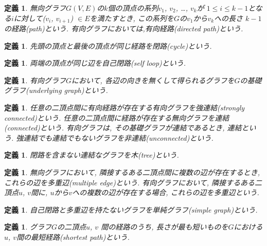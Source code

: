 \documentclass[11pt,a4j]{jsarticle}
\theoremstyle{plain}
\newtheorem{defi}[theo]{定義}
\def\vu{\mbox{\boldmath $u$}}
\def\vv{\mbox{\boldmath $v$}}
\def\node#1#2{\mbox{\boldmath $#1_{#2}$}}
\begin{document}
\begin{defi}
無向グラフ$G(V,E)$の$k$個の頂点の系列{\node v1}, {\node v2}, {\dots}, {\node vk}が $1\leq i \leq k - 1$となる$i$に対して({\node vi}, {\node v{i+1}}) $\in E$を満たすとき, この系列を$G$の{\node v1}から{\node vk}への長さ $k - 1$の経路(path)という. 有向グラフにおいては,有向経路(directed path)という. 
\end{defi}

\begin{defi}
先頭の頂点と最後の頂点が同じ経路を閉路(cycle)という.
\end{defi}

\begin{defi}
両端の頂点が同じ辺を自己閉路(self loop)という.
\end{defi}

\begin{defi}
有向グラフ$G$において, 各辺の向きを無くして得られるグラフを$G$の基礎グラフ(underlying graph)という.
\end{defi}

\begin{defi}
任意の二頂点間に有向経路が存在する有向グラフを強連結(strongly connected)という. 任意の二頂点間に経路が存在する無向グラフを連結(connected)という. 
有向グラフは, その基礎グラフが連結であるとき, 連結という. 強連結でも連結でもないグラフを非連結(unconnected)という.
\end{defi}

\begin{defi}
閉路を含まない連結なグラフを木(tree)という.
\end{defi}

\begin{defi}
無向グラフにおいて, 隣接するある二頂点間に複数の辺が存在するとき, これらの辺を多重辺(multiple edge)という. 有向グラフにおいて, 隣接するある二頂点{\vu , \vv}間に, 
{\vu}から{\vv}への複数の辺が存在する場合, これらの辺を多重辺という.
\end{defi}

\begin{defi}
自己閉路と多重辺を持たないグラフを単純グラフ(simple graph)という.
\end{defi}

\begin{defi}
グラフ$G$の二頂点{\vu , \vv} 間の経路のうち, 長さが最も短いものを$G$における{\vu , \vv}間の最短経路(shortest path)という.
\end{defi}
\end{document}
